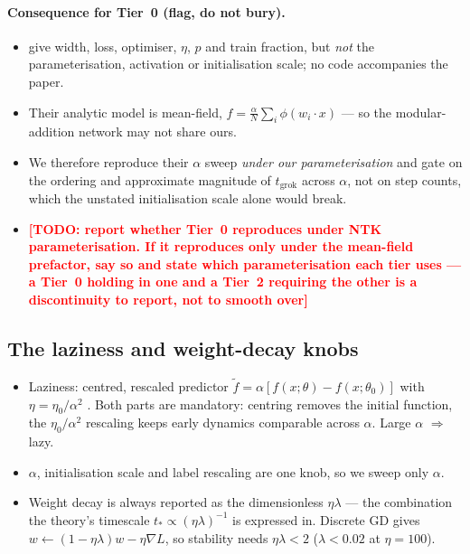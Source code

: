 \documentclass[a4paper,11pt]{article} %
\newcommand{\TODO}[1]{\textcolor{red}{\textbf{[TODO: #1]}}}
\newcommand{\tgrok}{t_{\mathrm{grok}}}
\begin{document}
\paragraph{Consequence for Tier~0 (flag, do not bury).}
\begin{itemize}
	\item \citet[App.~8.3]{kumar2024grokking} give width, loss, optimiser, $\eta$,
		$p$ and train fraction, but \emph{not} the parameterisation, activation or
		initialisation scale; no code accompanies the paper.
	\item Their analytic model \citep[Eq.~3]{kumar2024grokking} is mean-field,
		$f=\tfrac{\alpha}{N}\sum_i\phi(w_i\cdot x)$ --- so the modular-addition
		network may not share ours.
	\item We therefore reproduce their $\alpha$ sweep \emph{under our
		parameterisation} and gate on the ordering and approximate magnitude of
		$\tgrok$ across $\alpha$, not on step counts, which the unstated
		initialisation scale alone would break.
	\item \TODO{report whether Tier~0 reproduces under NTK parameterisation. If it
		reproduces only under the mean-field prefactor, say so and state which
		parameterisation each tier uses --- a Tier~0 holding in one and a Tier~2
		requiring the other is a discontinuity to report, not to smooth over}
\end{itemize}

\subsection{The laziness and weight-decay knobs}
\begin{itemize}
	\item Laziness: centred, rescaled predictor
		$\tilde f=\alpha[f(x;\theta)-f(x;\theta_0)]$ with $\eta=\eta_0/\alpha^2$
		\citep{chizat2019lazy,kumar2024grokking}. Both parts are mandatory: centring
		removes the initial function, the $\eta_0/\alpha^2$ rescaling keeps early
		dynamics comparable across $\alpha$. Large $\alpha$ $\Rightarrow$ lazy.
	\item $\alpha$, initialisation scale and label rescaling are one knob, so we
		sweep only $\alpha$.
	\item Weight decay is always reported as the dimensionless $\eta\lambda$ ---
		the combination the theory's timescale $t_*\propto(\eta\lambda)^{-1}$ is
		expressed in. Discrete GD gives $w\leftarrow(1-\eta\lambda)w-\eta\nabla L$,
		so stability needs $\eta\lambda<2$ ($\lambda<0.02$ at $\eta=100$).
\end{itemize}
\end{document}
